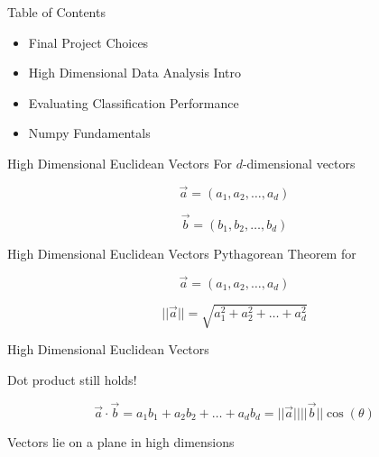 \documentclass{beamer}
\begin{document}
\begin{frame}{Table of Contents}
\begin{itemize}[label=$\vartriangleright$]
	\item Final Project Choices
\end{itemize}
\begin{itemize}[label=$\blacktriangleright$]
	\item High Dimensional Data Analysis Intro
\end{itemize}
\begin{itemize}[label=$\vartriangleright$]
	\item Evaluating Classification Performance
\end{itemize}
\begin{itemize}[label=$\vartriangleright$]
	\item Numpy Fundamentals
\end{itemize}
\end{frame}

\begin{frame}{High Dimensional Euclidean Vectors}
For $d$-dimensional vectors

\[ \vec{a} = (a_1, a_2, \hdots, a_d) \]

\[ \vec{b} = (b_1, b_2, \hdots, b_d) \]



\end{frame}

\begin{frame}{High Dimensional Euclidean Vectors}
Pythagorean Theorem for

\[ \vec{a} = (a_1, a_2, \hdots, a_d) \]


\[ ||\vec{a}|| = \sqrt{ a_1^2 + a_2^2 + \hdots + a_d^2 } \]

\end{frame}


\begin{frame}{High Dimensional Euclidean Vectors}

Dot product still holds!

\[ \vec{a} \cdot \vec{b} = a_1b_1 + a_2b_2 + \hdots + a_db_d = ||\vec{a}|| ||\vec{b}|| \cos(\theta) \]

Vectors lie on a plane in high dimensions

\end{frame}
\end{document}
